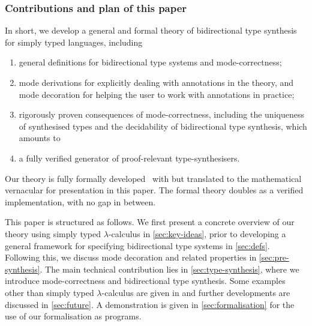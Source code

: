 \subsubsection{Contributions and plan of this paper}

%
In short, we develop a general and formal theory of bidirectional type synthesis for simply typed languages, including 
\begin{enumerate}
  \item general definitions for bidirectional type systems and mode-correctness;
  \item mode derivations for explicitly dealing with annotations in the theory, and mode decoration for helping the user to work with annotations in practice;
  \item rigorously proven consequences of mode-correctness, including the uniqueness of synthesised types and the decidability of bidirectional type synthesis, which amounts to
  \item a fully verified generator of proof-relevant type-synthesisers.
\end{enumerate}
Our theory is fully formally developed~\cite{Chen2024a} with \Agda but translated to the mathematical vernacular for presentation in this paper.
The formal theory doubles as a verified implementation, with no gap in between.


This paper is structured as follows.
We first present a concrete overview of our theory using simply typed $\lambda$-calculus in \cref{sec:key-ideas}, prior to developing a general framework for specifying bidirectional type systems in \cref{sec:defs}.
Following this, we discuss mode decoration and related properties in \cref{sec:pre-synthesis}.
The main technical contribution lies in \cref{sec:type-synthesis}, where we introduce mode-correctness and bidirectional type synthesis.
Some examples other than simply typed $\lambda$-calculus are given in  and further developments are discussed in \cref{sec:future}.
\ifarxiv
A demonstration is given in \cref{sec:formalisation} for the use of our \Agda formalisation as programs.
\fi
